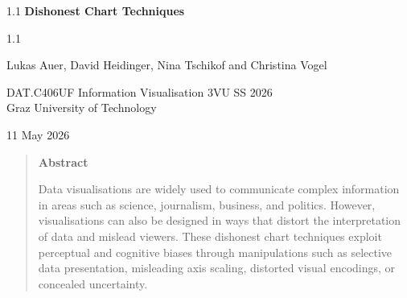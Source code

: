 \documentclass[11pt,onecolumn,twoside]{report}
\newcommand{\thistitle}{Dishonest Chart Techniques}  %
\newcommand{\thissubject}{}  %
\newcommand{\thisauthor}{Lukas Auer, David Heidinger, Nina Tschikof and Christina Vogel}          %
\newcommand{\thisdate}{11 May 2026}  %
\begin{document}
\unixdate

\normalsize
\pagestyle{empty}         %




\begin{titlepage}

\begin{center}

\begin{spacing}{1.1}
\Large\sffamily\bfseries
\thistitle
\end{spacing}

\ifstrempty{\thissubject}{}%
{%
\begin{spacing}{1.1}
\large\sffamily\bfseries
\thissubject
\end{spacing}
}


\vspace{1cm}

{\large\sffamily \thisauthor}


\vspace{1cm}



{\large
DAT.C406UF Information Visualisation 3VU SS 2026\\
Graz University of Technology \\[1cm]
}


\vspace{1cm}

\thisdate

\end{center}



\vspace{2cm}

\begin{quote}
\begin{center}
{\large\sffamily\bfseries Abstract}
\end{center}
Data visualisations are widely used to communicate complex information in areas such as science, journalism, business, and politics. However, visualisations can also be designed in ways that distort the interpretation of data and mislead viewers. These dishonest chart techniques exploit perceptual and cognitive biases through manipulations such as selective data presentation, misleading axis scaling, distorted visual encodings, or concealed uncertainty.


\end{quote}
\end{titlepage}
\end{document}
